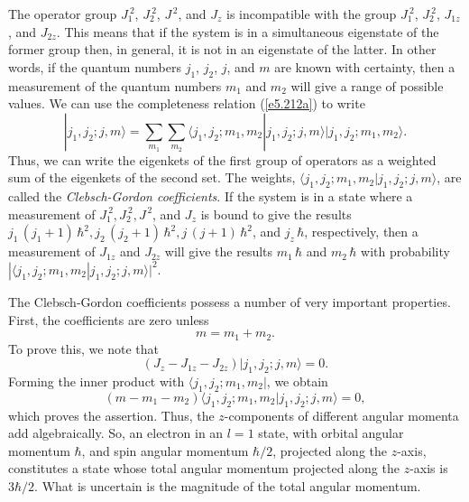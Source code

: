 The operator group $J_1^{~2}$, $J_2^{~2}$, $J^{\,2}$, and $J_z$
is incompatible with the group $J_1^{~2}$, $J_2^{~2}$, $J_{1z}$, and $J_{2z}$.
This means that if the system is in a simultaneous eigenstate of the former group
then, in general, it is not in an eigenstate of the latter. In other words,
if the quantum numbers $j_1$, $j_2$, $j$, and $m$ are known with
certainty, then a measurement of the quantum numbers $m_1$ and $m_2$ will
give a range of possible values. We can use the completeness relation
(\ref{e5.212a}) to write
\begin{equation}
|j_1,j_2;j,m\rangle = \sum_{m_1}\sum_{m_2} \langle j_1,j_2;m_1,m_2|j_1,j_2;j,m\rangle
|j_1,j_2;m_1,m_2\rangle.
\end{equation}
Thus, we can write the eigenkets of the first group of operators
as a weighted sum of the eigenkets of the second set. The weights,
$\langle j_1,j_2;m_1,m_2|j_1,j_2;j,m\rangle$, are called the {\em Clebsch-Gordon
coefficients}. If the system is in a state where a measurement of
$J_1^{~2}, J_2^{~2}, J^{\,2}$, and $J_z$ is bound to give the results
$j_1\,(j_1+1)\,\hbar^2, j_2\,(j_2+1)\,\hbar^2, j\,(j+1)\,\hbar^2$,
and $j_z\,\hbar$, respectively, then a measurement of $J_{1z}$ and $J_{2z}$
will give the results $m_1\,\hbar$ and $m_2\,\hbar$ with
probability $|\langle j_1,j_2;m_1,m_2|j_1,j_2;j,m\rangle|^2$. 

The Clebsch-Gordon coefficients possess a number of very important properties.
First, the coefficients are zero unless
\begin{equation}\label{e5.214}
m = m_1 + m_2.
\end{equation}
To prove this, we note that
\begin{equation}
(J_z - J_{1z} - J_{2z}) |j_1,j_2; j, m\rangle =0.
\end{equation}
Forming the inner product with $\langle j_1, j_2; m_1, m_2|$, we obtain
\begin{equation}
(m-m_1-m_2) \langle j_1, j_2; m_1, m_2|j_1,j_2; j, m\rangle=0,
\end{equation}
which proves the assertion. Thus, the $z$-components of different angular momenta
add algebraically. So, an electron in an $l=1$ state, with orbital
angular momentum $\hbar$, and spin angular momentum $\hbar/2$, projected along the
$z$-axis,  constitutes a state whose total angular momentum projected
along the $z$-axis is $3\hbar/2$. What is uncertain is the magnitude of the
total angular momentum. 

